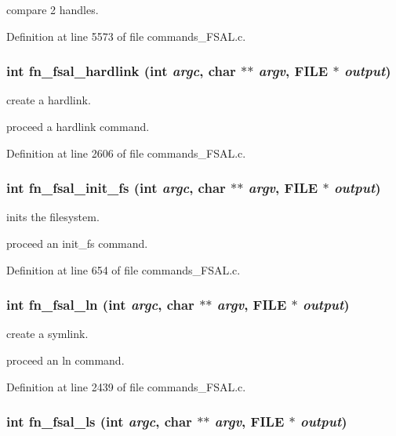 compare 2 handles. 

Definition at line 5573 of file commands\_\-FSAL.c.
\subsubsection[{fn\_\-fsal\_\-hardlink}]{\setlength{\rightskip}{0pt plus 5cm}int fn\_\-fsal\_\-hardlink (int {\em argc}, \/  char $\ast$$\ast$ {\em argv}, \/  FILE $\ast$ {\em output})}\label{commands_8h_c9df7662f276abcf5428e6ff5f44593c}


create a hardlink.

proceed a hardlink command. 

Definition at line 2606 of file commands\_\-FSAL.c.
\subsubsection[{fn\_\-fsal\_\-init\_\-fs}]{\setlength{\rightskip}{0pt plus 5cm}int fn\_\-fsal\_\-init\_\-fs (int {\em argc}, \/  char $\ast$$\ast$ {\em argv}, \/  FILE $\ast$ {\em output})}\label{commands_8h_1c17fec3f6f369ed33c6e6881c7600e1}


inits the filesystem.

proceed an init\_\-fs command. 

Definition at line 654 of file commands\_\-FSAL.c.
\subsubsection[{fn\_\-fsal\_\-ln}]{\setlength{\rightskip}{0pt plus 5cm}int fn\_\-fsal\_\-ln (int {\em argc}, \/  char $\ast$$\ast$ {\em argv}, \/  FILE $\ast$ {\em output})}\label{commands_8h_8499a47dcd7307683cfde786a7bed5e2}


create a symlink.

proceed an ln command. 

Definition at line 2439 of file commands\_\-FSAL.c.
\subsubsection[{fn\_\-fsal\_\-ls}]{\setlength{\rightskip}{0pt plus 5cm}int fn\_\-fsal\_\-ls (int {\em argc}, \/  char $\ast$$\ast$ {\em argv}, \/  FILE $\ast$ {\em output})}\label{commands_8h_07b7bb33d2fb103bd10446701b19015d}


